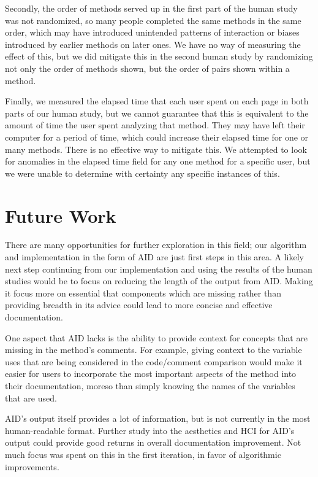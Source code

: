 \documentclass[preprint]{sigplanconf}
\begin{document}
Secondly, the order of methods served up in the first part of the human study was not randomized, so many people completed the same methods in the same order, which may have introduced unintended patterns of interaction or biases introduced by earlier methods on later ones. We have no way of measuring the effect of this, but we did mitigate this in the second human study by randomizing not only the order of methods shown, but the order of pairs shown within a method.

Finally, we measured the elapsed time that each user spent on each page in both parts of our human study, but we cannot guarantee that this is equivalent to the amount of time the user spent analyzing that method. They may have left their computer for a period of time, which could increase their elapsed time for one or many methods. There is no effective way to mitigate this. We attempted to look for anomalies in the elapsed time field for any one method for a specific user, but we were unable to determine with certainty any specific instances of this.

\section{Future Work}
There are many opportunities for further exploration in this field; our algorithm and implementation in the form of AID are just first steps in this area. A likely next step continuing from our implementation and using the results of the human studies would be to focus on reducing the length of the output from AID. Making it focus more on essential that components which are missing rather than providing breadth in its advice could lead to more concise and effective documentation.

One aspect that AID lacks is the ability to provide context for concepts that are missing in the method's comments. For example, giving context to the variable uses that are being considered in the code/comment comparison would make it easier for users to incorporate the most important aspects of the method into their documentation, moreso than simply knowing the names of the variables that are used.

AID's output itself provides a lot of information, but is not currently in the most human-readable format. Further study into the aesthetics and HCI for AID's output could provide good returns in overall documentation improvement. Not much focus was spent on this in the first iteration, in favor of algorithmic improvements.
\end{document}

